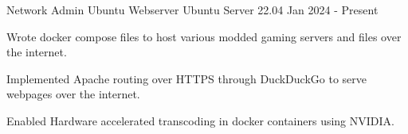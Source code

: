   \begin{cventry}
    {Network Admin} %
    {Ubuntu Webserver} %
    {Ubuntu Server 22.04} %
    {Jan 2024 - Present} %
    {
      \begin{cvitems} %
        \item {
        Wrote docker compose files to host various modded gaming servers and files over the internet.
        }
        \item {
        Implemented Apache routing over HTTPS through DuckDuckGo to serve webpages over the internet.
        }
        \item {
        Enabled Hardware accelerated transcoding in docker containers using NVIDIA.
        }
      \end{cvitems}
    }
  \end{cventry}

